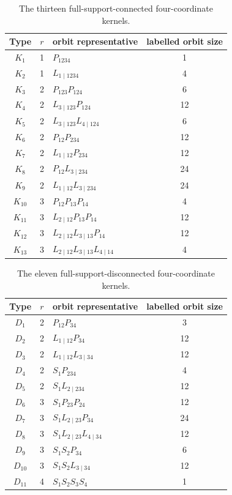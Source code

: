\begin{table}[htbp]
\centering
\small
\caption{The thirteen full-support-connected four-coordinate kernels.}
\label{tab:four-coordinate-connected-kernels}
\begin{tabular}{cclc}
\toprule
Type & $r$ & orbit representative & labelled orbit size\\
\midrule
$K_1$  &1& $P_{1234}$ &1\\
$K_2$  &1& $L_{1\mid1234}$ &4\\
$K_3$  &2& $P_{123}P_{124}$ &6\\
$K_4$  &2& $L_{3\mid123}P_{124}$ &12\\
$K_5$  &2& $L_{3\mid123}L_{4\mid124}$ &6\\
$K_6$  &2& $P_{12}P_{234}$ &12\\
$K_7$  &2& $L_{1\mid12}P_{234}$ &12\\
$K_8$  &2& $P_{12}L_{3\mid234}$ &24\\
$K_9$  &2& $L_{1\mid12}L_{3\mid234}$ &24\\
$K_{10}$&3& $P_{12}P_{13}P_{14}$ &4\\
$K_{11}$&3& $L_{2\mid12}P_{13}P_{14}$ &12\\
$K_{12}$&3& $L_{2\mid12}L_{3\mid13}P_{14}$ &12\\
$K_{13}$&3& $L_{2\mid12}L_{3\mid13}L_{4\mid14}$ &4\\
\bottomrule
\end{tabular}
\end{table}

\begin{table}[htbp]
\centering
\small
\caption{The eleven full-support-disconnected four-coordinate kernels.}
\label{tab:four-coordinate-disconnected-kernels}
\begin{tabular}{cclc}
\toprule
Type & $r$ & orbit representative & labelled orbit size\\
\midrule
$D_1$  &2& $P_{12}P_{34}$ &3\\
$D_2$  &2& $L_{1\mid12}P_{34}$ &12\\
$D_3$  &2& $L_{1\mid12}L_{3\mid34}$ &12\\
$D_4$  &2& $S_1P_{234}$ &4\\
$D_5$  &2& $S_1L_{2\mid234}$ &12\\
$D_6$  &3& $S_1P_{23}P_{24}$ &12\\
$D_7$  &3& $S_1L_{2\mid23}P_{34}$ &24\\
$D_8$  &3& $S_1L_{2\mid23}L_{4\mid34}$ &12\\
$D_9$  &3& $S_1S_2P_{34}$ &6\\
$D_{10}$&3& $S_1S_2L_{3\mid34}$ &12\\
$D_{11}$&4& $S_1S_2S_3S_4$ &1\\
\bottomrule
\end{tabular}
\end{table}

